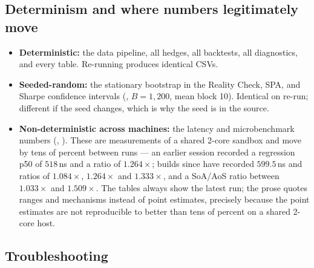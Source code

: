 \subsection{Determinism and where numbers legitimately move}

\begin{itemize}
  \item \textbf{Deterministic:} the data pipeline, all hedges, all backtests, all
    diagnostics, and every table. Re-running produces identical CSVs.
  \item \textbf{Seeded-random:} the stationary bootstrap in the Reality Check, SPA, and
    Sharpe confidence intervals (, $B=1{,}200$, mean block 10). Identical on
    re-run; different if the seed changes, which is why the seed is in the source.
  \item \textbf{Non-deterministic across machines:} the latency and microbenchmark numbers
    (, ). These are measurements of a
    shared 2-core sandbox and move by tens of percent between runs --- an earlier session
    recorded a regression p50 of $518$\,ns and a  ratio of $1.264\times$; builds
    since have recorded $599.5$\,ns and ratios of $1.084\times$, $1.264\times$ and
    $1.333\times$, and a SoA/AoS ratio between $1.033\times$ and $1.509\times$. The tables
    always show the latest run; the prose quotes ranges and mechanisms instead of point
    estimates, precisely because the point estimates are not reproducible to better than
    tens of percent on a shared 2-core host.
\end{itemize}

\subsection{Troubleshooting}

